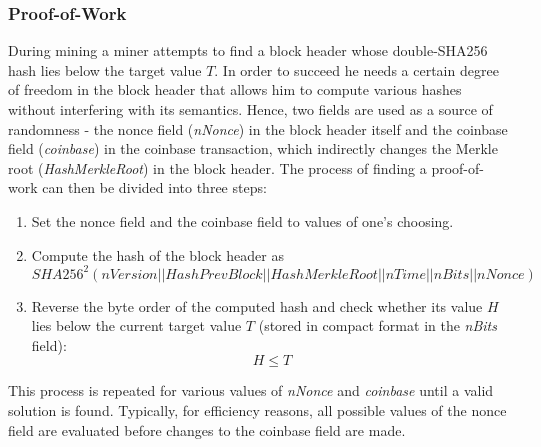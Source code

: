 \subsubsection*{Proof-of-Work}
During mining a miner attempts to find a block header whose double-SHA256 hash lies below the target value $T$. In order to succeed he needs a certain degree of freedom in the block header that allows him to compute various hashes without interfering with its semantics. Hence, two fields are used as a source of randomness - the nonce field (\textit{nNonce}) in the block header itself and the coinbase field (\textit{coinbase}) in the coinbase transaction, which indirectly changes the Merkle root (\textit{HashMerkleRoot}) in the block header. The process of finding a proof-of-work can then be divided into three steps:

\begin{enumerate}[label=\arabic*), leftmargin=1cm]
\item Set the nonce field and the coinbase field to values of one's choosing.
\item Compute the hash of the block header as
\begin{equation}
SHA256^{2}(nVersion||HashPrevBlock||HashMerkleRoot||nTime||nBits||nNonce)
\label{eqn:HashBlock}
\end{equation}
\item Reverse the byte order of the computed hash and check whether its value $\mathit{H}$ lies below the current target value $\mathit{T}$ (stored in compact format in the \textit{nBits} field):
\begin{equation}
H \leq T
\end{equation}

\end{enumerate}

\noindent
This process is repeated for various values of \textit{nNonce} and \textit{coinbase} until a valid solution is found. Typically, for efficiency reasons, all possible values of the nonce field are evaluated before changes to the coinbase field are made.